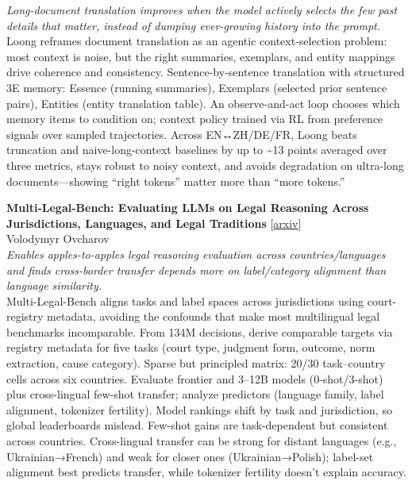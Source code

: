 \documentclass[12pt,letterpaper]{article}
\begin{document}
{\small\textit{Long-document translation improves when the model actively selects the few past details that matter, instead of dumping ever-growing history into the prompt.}}\\[1pt]
{\footnotesize Loong reframes document translation as an agentic context-selection problem: most context is noise, but the right summaries, exemplars, and entity mappings drive coherence and consistency. Sentence-by-sentence translation with structured 3E memory: Essence (running summaries), Exemplars (selected prior sentence pairs), Entities (entity translation table). An observe-and-act loop chooses which memory items to condition on; context policy trained via RL from preference signals over sampled trajectories. Across EN↔ZH/DE/FR, Loong beats truncation and naive-long-context baselines by up to \textasciitilde{}13 points averaged over three metrics, stays robust to noisy context, and avoids degradation on ultra-long documents---showing ``right tokens'' matter more than ``more tokens.''}

\medskip

{\small\textbf{Multi-Legal-Bench: Evaluating LLMs on Legal Reasoning Across Jurisdictions, Languages, and Legal Traditions}} {\scriptsize[\href{https://arxiv.org/abs/2605.29738}{arxiv}]}\\
{\scriptsize Volodymyr Ovcharov}\\

{\small\textit{Enables apples-to-apples legal reasoning evaluation across countries/languages and finds cross-border transfer depends more on label/category alignment than language similarity.}}\\[1pt]
{\footnotesize Multi-Legal-Bench aligns tasks and label spaces across jurisdictions using court-registry metadata, avoiding the confounds that make most multilingual legal benchmarks incomparable. From 134M decisions, derive comparable targets via registry metadata for five tasks (court type, judgment form, outcome, norm extraction, cause category). Sparse but principled matrix: 20/30 task--country cells across six countries. Evaluate frontier and 3--12B models (0-shot/3-shot) plus cross-lingual few-shot transfer; analyze predictors (language family, label alignment, tokenizer fertility). Model rankings shift by task and jurisdiction, so global leaderboards mislead. Few-shot gains are task-dependent but consistent across countries. Cross-lingual transfer can be strong for distant languages (e.g., Ukrainian→French) and weak for closer ones (Ukrainian→Polish); label-set alignment best predicts transfer, while tokenizer fertility doesn't explain accuracy.}
\end{document}
